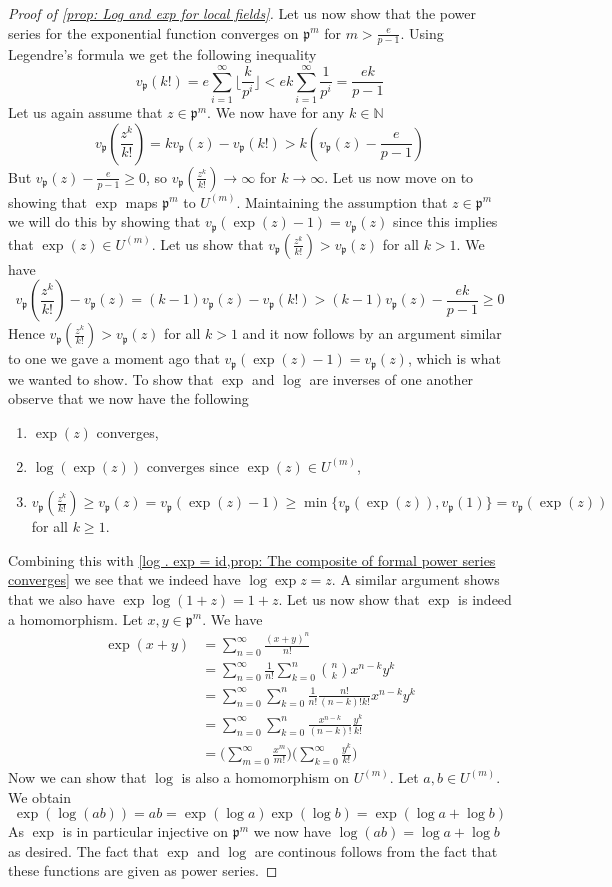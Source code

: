 \documentclass{article}
\newcommand{\mfrak}[1]{\mathfrak{#1}}
\newcommand{\mbb}[1]{\mathbb{#1}}
\newcommand{\vp}{{v_{\mfrak p}}}
\numberwithin{equation}{section}
\begin{document}
\begin{proof}[Proof of \cref{prop: Log and exp for local fields}]
    Let us now show that the power series for the exponential function converges on $\mfrak p^m$ for $m > \frac{e}{p-1}$. Using Legendre's formula we get the following inequality
    $$\vp(k!) = e\sum_{i=1}^\infty \lfloor \frac{k}{p^i} \rfloor < ek \sum_{i=1}^\infty \frac{1}{p^i} = \frac{ek}{p-1}$$
    Let us again assume that $z \in \mfrak p^m$. We now have for any $k \in \mbb N$
    $$\vp(\frac{z^k}{k!}) = k\vp(z) - \vp(k!) > k(\vp(z) - \frac{e}{p-1})$$
    But $\vp(z) - \frac{e}{p-1} \geq 0$, so $\vp(\frac{z^k}{k!}) \to \infty$ for $k \to \infty$. Let us now move on to showing that $\exp$ maps $\mfrak p^m$ to $U^{(m)}$. Maintaining the assumption that $z \in \mfrak p^m$ we will do this by showing that $\vp(\exp(z) - 1) = \vp(z)$ since this implies that $\exp(z) \in U^{(m)}$. Let us show that $\vp(\frac{z^k}{k!}) > \vp(z)$ for all $k > 1$. We have
    $$\vp(\frac{z^k}{k!}) - \vp(z) = (k-1)\vp(z) - \vp(k!) > (k-1)\vp(z) - \frac{ek}{p-1} \geq 0$$
    Hence $\vp(\frac{z^k}{k!}) > \vp(z)$ for all $k > 1$ and it now follows by an argument similar to one we gave a moment ago that $\vp(\exp(z) - 1) = \vp(z)$, which is what we wanted to show. To show that $\exp$ and $\log$ are inverses of one another observe that we now have the following
    \begin{enumerate}
        \item $\exp(z)$ converges,
        \item $\log(\exp(z))$ converges since $\exp(z) \in U^{(m)}$,
        \item $\vp(\frac{z^k}{k!}) \geq \vp(z) = \vp(\exp(z) - 1) \geq \min\{\vp(\exp(z)), \vp(1)\} = \vp(\exp(z))$ for all $k \geq 1$.
    \end{enumerate}
    Combining this with \cref{log . exp = id,prop: The composite of formal power series converges} we see that we indeed have $\log \exp z = z$. A similar argument shows that we also have $\exp \log (1 + z) = 1 + z$. Let us now show that $\exp$ is indeed a homomorphism. Let $x,y \in \mfrak p^m$. We have
    \begin{align*}
        \exp (x + y) &= \sum_{n = 0}^\infty \frac{(x+y)^n}{n!} \\ 
        &= \sum_{n=0}^\infty \frac{1}{n!} \sum_{k = 0}^n \binom{n}{k} x^{n-k}y^k \\
        &= \sum_{n=0}^\infty \sum_{k = 0}^n \frac{1}{n!}\frac{n!}{(n-k)!k!}x^{n-k}y^k \\
        &= \sum_{n=0}^\infty \sum_{k = 0}^n \frac{x^{n-k}}{(n-k)!}\frac{y^k}{k!} \\
        &= \bigl(\sum_{m = 0}^\infty \frac{x^m}{m!} \bigr)\bigl(\sum_{k = 0}^\infty \frac{y^k}{k!} \bigr)
    \end{align*}
    Now we can show that $\log$ is also a homomorphism on $U^{(m)}$. Let $a,b \in U^{(m)}$. We obtain 
    $$\exp(\log(ab)) = ab = \exp(\log a) \exp(\log b) = \exp(\log a + \log b)$$
    As $\exp$ is in particular injective on $\mfrak p^{m}$ we now have $\log(ab) = \log a + \log b$ as desired. The fact that $\exp$ and $\log$ are continous follows from the fact that these functions are given as power series.
\end{proof}
\end{document}
